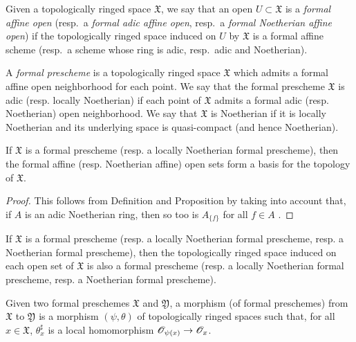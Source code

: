 \begin{env}[10.4.1]
\label{I.10.4.1}
Given a topologically ringed space $\mathfrak{X}$, we say that an open $U\subset\mathfrak{X}$ is a \emph{formal affine open} (resp.~a \emph{formal adic affine open}, resp.~a \emph{formal Noetherian affine open}) if the topologically ringed space induced on $U$ by $\mathfrak{X}$ is a formal affine scheme (resp.~a scheme whose ring is adic, resp.~adic and Noetherian).
\end{env}

\begin{definition}[10.4.2]
\label{I.10.4.2}
A \emph{formal prescheme} is a topologically ringed space $\mathfrak{X}$ which admits a formal affine open neighborhood for each point.
We say that the formal prescheme $\mathfrak{X}$ is adic (resp. locally Noetherian) if each point of $\mathfrak{X}$ admits a formal adic (resp. Noetherian) open neighborhood.
We say that $\mathfrak{X}$ is Noetherian if it is locally Noetherian and its underlying space is quasi-compact (and hence Noetherian).
\end{definition}

\begin{proposition}[10.4.3]
\label{I.10.4.3}
If $\mathfrak{X}$ is a formal prescheme (resp. a locally Noetherian formal prescheme), then the formal affine (resp. Noetherian affine) open sets form a basis for the topology of $\mathfrak{X}$.
\end{proposition}

\begin{proof}
This follows from Definition  and Proposition  by taking into account that, if $A$ is an adic Noetherian ring, then so too is $A_{\{f\}}$ for all $f\in A$ .
\end{proof}

\begin{corollary}[10.4.4]
\label{I.10.4.4}
If $\mathfrak{X}$ is a formal prescheme (resp. a locally Noetherian formal prescheme, resp. a Noetherian formal prescheme), then the topologically ringed space induced on each open set of $\mathfrak{X}$ is also a formal prescheme (resp. a locally Noetherian formal prescheme, resp. a Noetherian formal prescheme).
\end{corollary}

\begin{definition}[10.4.5]
\label{I.10.4.5}
Given two formal preschemes $\mathfrak{X}$ and $\mathfrak{Y}$, a morphism (of formal preschemes) from $\mathfrak{X}$ to $\mathfrak{Y}$ is a morphism $(\psi,\theta)$ of topologically ringed spaces such that, for all $x\in\mathfrak{X}$, $\theta_x^\sharp$ is a local homomorphism $\sh{O}_{\psi(x)}\to\sh{O}_x$.
\end{definition}

